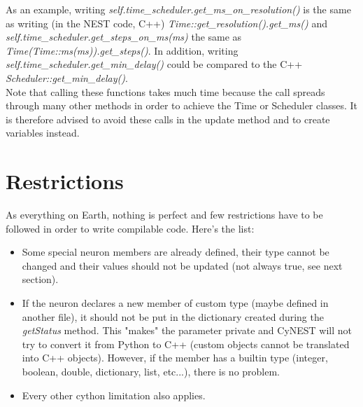 \documentclass{article}
\begin{document}
As an example, writing \emph{self.time\_scheduler.get\_ms\_on\_resolution()} is the same as writing (in the NEST code, C++) \emph{Time::get\_resolution().get\_ms()} and \\ \emph{self.time\_scheduler.get\_steps\_on\_ms(ms)} the same as \emph{Time(Time::ms(ms)).get\_steps()}. In addition, writing \emph{self.time\_scheduler.get\_min\_delay()} could be compared to the C++ \emph{Scheduler::get\_min\_delay()}.\\
Note that calling these functions takes much time because the call spreads through many other methods in order to achieve the Time or Scheduler classes. It is therefore advised to avoid these calls in the update method and to create variables instead.


\section{Restrictions}
As everything on Earth, nothing is perfect and few restrictions have to be followed in order to write compilable code. Here's the list:
\begin{itemize}
\item Some special neuron members are already defined, their type cannot be changed and their values should not be updated (not always true, see next section).
\item If the neuron declares a new member of custom type (maybe defined in another file), it should not be put in the dictionary created during the \emph{getStatus} method. This "makes" the parameter private and CyNEST will not try to convert it from Python to C++ (custom objects cannot be translated into C++ objects). However, if the member has a builtin type (integer, boolean, double, dictionary, list, etc...), there is no problem.
\item Every other cython limitation also applies.
\end{itemize}
\end{document}
